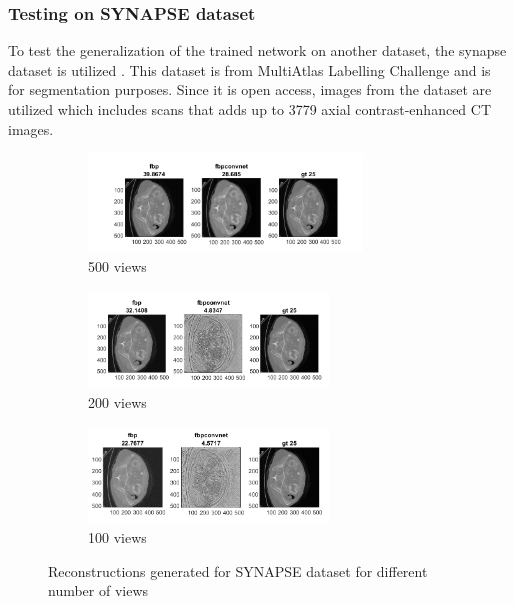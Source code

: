 \documentclass[journal, onecolumn, 11pt]{IEEEtran}
\begin{document}
\subsubsection{Testing on SYNAPSE dataset}
To test the generalization of the trained network on another dataset, the synapse dataset is utilized \cite{SYNAPSE}. This dataset is from MultiAtlas Labelling Challenge and is for segmentation purposes. Since it is open access, images from the dataset are utilized which includes scans that adds up to 3779 axial contrast-enhanced CT images. 

\begin{figure}[h]
\centering
\begin{subfigure}[b]{\textwidth}
\centering
\includegraphics[width=0.8\textwidth]{images/SS2.png}
\caption{500 views}\label{subfig:3a}
\end{subfigure}
\begin{subfigure}[b]{\linewidth}
\centering
\includegraphics[width=0.7\textwidth]{images/SS5.png}
\caption{200 views}\label{subfig:3b}
\end{subfigure}
\begin{subfigure}[b]{\linewidth}
\centering
\includegraphics[width=0.7\textwidth]{images/SS10.png}
\caption{100 views}\label{subfig:3c}
\end{subfigure}
\caption{Reconstructions generated for SYNAPSE dataset for different number of views}
\label{fig:Synapses}
\end{figure}
\end{document}
